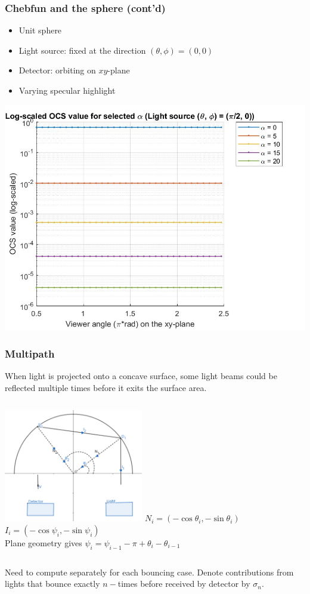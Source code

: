 \documentclass{beamer}
\begin{document}
\begin{frame}[t]
\frametitle{Chebfun and the sphere (cont'd)}
\begin{itemize}
\item Unit sphere
\item Light source: fixed at the direction $(\theta,\phi) = (0,0)$
\item Detector: orbiting on $xy$-plane
\item Varying specular highlight
\end{itemize}

\centering \includegraphics[scale=0.13]{./figs/OCS_perpendicular_plane}
\end{frame}


\begin{frame}[t]
\frametitle{Multipath}
When light is projected onto a concave surface, some light beams could be reflected multiple times before it exits the surface area. 
\begin{columns}
 \includegraphics[width=2.4in]{./figs/multipath_edit.pdf}
 $N_i=(-\cos \theta_i,-\sin\theta_i)$\\ $I_i=(-\cos \psi_i,-\sin\psi_i)$\\ Plane geometry gives $\psi_{i}=\psi_{i-1}-\pi+\theta_i-\theta_{i-1}$
\end{columns}
Need to compute separately for each bouncing case. Denote contributions from lights that bounce exactly $n-$times before received by detector by $\sigma_n$.
\end{frame}
\end{document}
